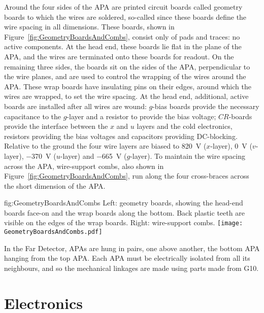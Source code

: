 Around the four sides of the APA are printed circuit boards called geometry boards to which the wires are soldered, so-called since these boards define the wire spacing in all dimensions. These boards, shown in Figure~\ref{fig:GeometryBoardsAndCombs}, consist only of pads and traces: no active components. At the head end, these boards lie flat in the plane of the APA, and the wires are terminated onto these boards for readout. On the remaining three sides, the boards sit on the sides of the APA, perpendicular to the wire planes, and are used to control the wrapping of the wires around the APA. These wrap boards have insulating pins on their edges, around which the wires are wrapped, to set the wire spacing. At the head end, additional, active boards are installed after all wires are wound: $g$-bias boards provide the necessary capacitance to the $g$-layer and a resistor to provide the bias voltage; $CR$-boards provide the interface between the $x$ and $u$ layers and the cold electronics, resistors providing the bias voltages and capacitors providing DC-blocking. Relative to the ground the four wire layers are biased to \SI{820}{\volt} ($x$-layer), \SI{0}{\volt} ($v$-layer), \SI{-370}{\volt} ($u$-layer) and \SI{-665}{\volt} ($g$-layer). To maintain the wire spacing across the APA, wire-support combs, also shown in Figure~\ref{fig:GeometryBoardsAndCombs}, run along the four cross-braces across the short dimension of the APA.

\begin{dunefigure}{fig:GeometryBoardsAndCombs}
{Left: geometry boards, showing the head-end boards face-on and the wrap boards along the bottom. Back plastic teeth are visible on the edges of the wrap boards. Right: wire-support combs.}
\texttt{[image: GeometryBoardsAndCombs.pdf]}
\end{dunefigure}

In the Far Detector, APAs are hung in pairs, one above another, the bottom APA hanging from the top APA. Each APA must be electrically isolated from all its neighbours, and so the mechanical linkages are made using parts made from G10.


\section{Electronics}
\label{sec:fdsp-exec-electronics}

